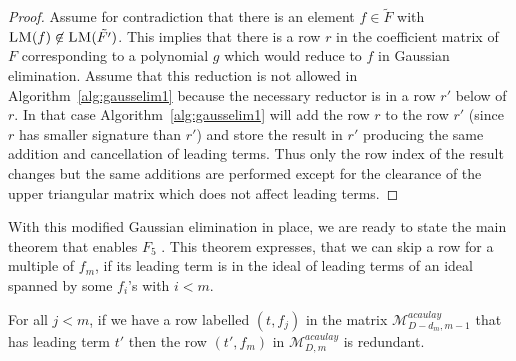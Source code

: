 \begin{proof}
Assume for contradiction that there is an element $f \in \tilde{F}$ with $\textsc{LM}(f) \not\in \textsc{LM}(\tilde{F'})$. This implies that there is a row $r$ in the coefficient matrix of $F$ corresponding to a polynomial $g$ which would reduce to $f$ in Gaussian elimination. Assume that this reduction is not allowed in Algorithm~\ref{alg:gausselim1} because the necessary reductor is in a row
$r'$ below of $r$. In that case Algorithm~\ref{alg:gausselim1} will add the row $r$ to the row $r'$ (since $r$ has smaller signature than $r'$) and store the result in $r'$ producing the same addition and cancellation of leading terms. Thus only the row index of the result changes but the same additions are performed except for the clearance of the upper triangular matrix which does not affect leading terms.
\end{proof}

With this modified Gaussian elimination in place, we are ready to state the main theorem that enables $F_5$ \cite{f5}. This theorem expresses, that we can skip a row for a multiple of $f_m$, if its leading term is in the ideal of leading terms of an ideal spanned by some $f_i$'s with $i<m$.

\begin{theorem}[$F_5$ Criterion]
For all $j < m$, if we have a row labelled $(t, f_j)$ in the matrix $\mathcal{M}^{acaulay}_{D-d_m,m-1}$ that has leading term $t'$ then the row $(t', f_m)$ in $\mathcal{M}^{acaulay}_{D,m}$ is
redundant.
\end{theorem}

